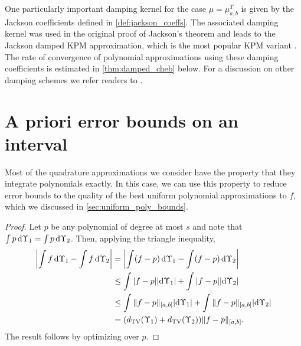 One particularly important damping kernel for the case \( \mu = \mu_{a,b}^T \) is given by the Jackson coefficients defined in \cref{def:jackson_coeffs}.
The associated damping kernel was used in the original proof of Jackson's theorem \cite{jackson_12} and leads to the Jackson damped KPM approximation, which is the most popular KPM variant \cite{weisse_wellein_alvermann_fehske_06,braverman_krishnan_musco_22}.
The rate of convergence of polynomial approximations using these damping coefficients is estimated in \cref{thm:damped_cheb} below.
For a discussion on other damping schemes we refer readers to \cite{weisse_wellein_alvermann_fehske_06,lin_saad_yang_16}.


\section{A priori error bounds on an interval}
\label{sec:quadrature_apriori}

Most of the quadrature approximations we consider have the property that they integrate polynomials exactly. 
In this case, we can use this property to reduce error bounds to the quality of the best uniform polynomial approximations to \( f \), which we discussed in \cref{sec:uniform_poly_bounds}.



\begin{proof}%
    Let \( p \) be any polynomial of degree at most \( s \) and note that \( \int p \,\textup{d}\Upsilon_1 = \int p \,\textup{d}\Upsilon_2 \).
    Then, applying the triangle inequality,
    \begin{align*}
        \left| \int f \,\textup{d} \Upsilon_1 - \int f \,\textup{d}\Upsilon_2 \right|
        & = \left| \int (f - p) \,\textup{d} \Upsilon_1 - \int (f-p) \,\textup{d}\Upsilon_2 \right|
        \\& \leq \int |f - p| |\textup{d} \Upsilon_1| + \int |f - p| |\textup{d} \Upsilon_2| 
        \\& \leq \int \|f - p\|_{[a,b]} |\textup{d} \Upsilon_1| + \int \|f - p\|_{[a,b]} |\textup{d} \Upsilon_2|
        \\& = (d_{\mathrm{TV}}(\Upsilon_1)+d_{\mathrm{TV}}(\Upsilon_2)) \| f - p \|_{[a,b]}.
    \end{align*}    
    The result follows by optimizing over \( p \).
\end{proof}

